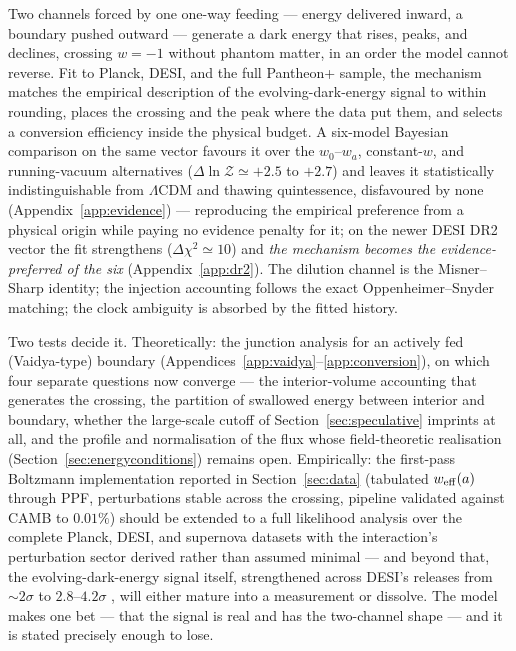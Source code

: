 \documentclass[11pt,a4paper]{article}
\newcommand{\lcdm}{\ensuremath{\Lambda}CDM}
\newcommand{\weff}{w_{\rm eff}}
\begin{document}
Two channels forced by one one-way feeding --- energy delivered inward, a boundary pushed outward --- generate a dark energy that rises, peaks, and declines, crossing $w=-1$ without phantom matter, in an order the model cannot reverse. Fit to Planck, DESI, and the full Pantheon+ sample, the mechanism matches the empirical description of the evolving-dark-energy signal to within rounding, places the crossing and the peak where the data put them, and selects a conversion efficiency inside the physical budget. A six-model Bayesian comparison on the same vector favours it over the $w_0$--$w_a$, constant-$w$, and running-vacuum alternatives ($\Delta\ln\mathcal{Z}\simeq+2.5$ to $+2.7$) and leaves it statistically indistinguishable from \lcdm{} and thawing quintessence, disfavoured by none (Appendix~\ref{app:evidence}) --- reproducing the empirical preference from a physical origin while paying no evidence penalty for it; on the newer DESI DR2 vector the fit strengthens ($\Delta\chi^2\simeq10$) and \emph{the mechanism becomes the evidence-preferred of the six} (Appendix~\ref{app:dr2}). The dilution channel is the Misner--Sharp identity; the injection accounting follows the exact Oppenheimer--Snyder matching; the clock ambiguity is absorbed by the fitted history.

Two tests decide it. Theoretically: the junction analysis for an actively fed (Vaidya-type) boundary (Appendices~\ref{app:vaidya}--\ref{app:conversion}), on which four separate questions now converge --- the interior-volume accounting that generates the crossing, the partition of swallowed energy between interior and boundary, whether the large-scale cutoff of Section~\ref{sec:speculative} imprints at all, and the profile and normalisation of the flux whose field-theoretic realisation (Section~\ref{sec:energyconditions}) remains open. Empirically: the first-pass Boltzmann implementation reported in Section~\ref{sec:data} (tabulated $\weff(a)$ through PPF, perturbations stable across the crossing, pipeline validated against CAMB to $0.01\%$) should be extended to a full likelihood analysis over the complete Planck, DESI, and supernova datasets with the interaction's perturbation sector derived rather than assumed minimal --- and beyond that, the evolving-dark-energy signal itself, strengthened across DESI's releases from $\sim2\sigma$ to $2.8$--$4.2\sigma$ \citep{DESI_DR2}, will either mature into a measurement or dissolve. The model makes one bet --- that the signal is real and has the two-channel shape --- and it is stated precisely enough to lose.
\end{document}
